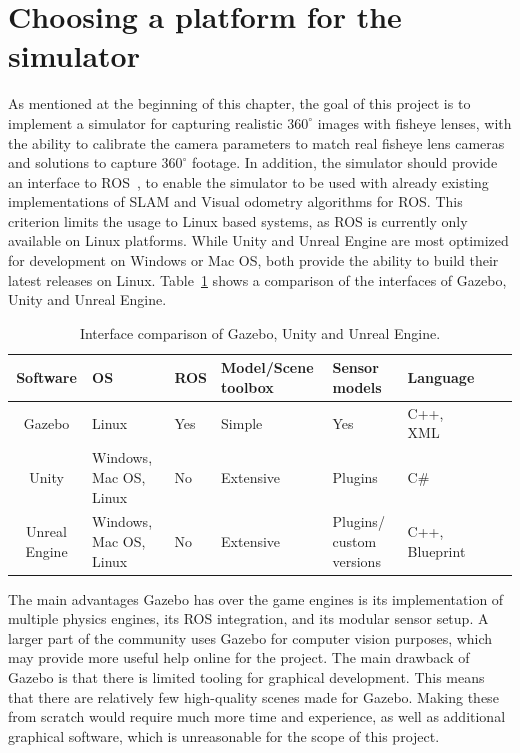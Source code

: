 \section{Choosing a platform for the simulator} \label{sec:Chooseplatform}

As mentioned at the beginning of this chapter, the goal of this project is to implement a simulator for capturing realistic $360^\circ$ images with fisheye lenses, with the ability to calibrate the camera parameters to match real fisheye lens cameras and solutions to capture $360^\circ$ footage. In addition, the simulator should provide an interface to ROS~\cite{ROSpaper}, to enable the simulator to be used with already existing implementations of SLAM and Visual odometry algorithms for ROS. This criterion limits the usage to Linux based systems, as ROS is currently only available on Linux platforms. While Unity and Unreal Engine are most optimized for development on Windows or Mac OS, both provide the ability to build their latest releases on Linux. Table~\ref{tab:comparison_interface} shows a comparison of the interfaces of Gazebo, Unity and Unreal Engine.

\begin{table}[!htb]
    \centering
    \caption{Interface comparison of Gazebo, Unity and Unreal Engine.}
    \label{tab:comparison_interface}
    \begin{tabular}{|c|>{\centering\arraybackslash}m{2cm}|>{\centering\arraybackslash}m{2cm}|>{\centering\arraybackslash}m{2.8cm}|>{\centering\arraybackslash}m{2cm}|>{\centering\arraybackslash}m{2cm}|>{\centering\arraybackslash}m{2cm}|>{\centering\arraybackslash}m{2cm}|} \hline
        \textbf{Software}          & \textbf{OS}  & \textbf{ROS} & \textbf{Model/Scene toolbox}   & \textbf{Sensor models} & \textbf{Language}              \\ \hline \hline
        Gazebo          & Linux           & Yes           & Simple  & Yes & C++, XML                 \\ \hline
        Unity           & Windows, Mac OS, Linux                    & No            & Extensive & Plugins & C\# \\ \hline
        Unreal Engine   & Windows, Mac OS, Linux  & No            & Extensive & Plugins/ custom versions & C++, Blueprint \\ \hline
    \end{tabular}
\end{table}

The main advantages Gazebo has over the game engines is its implementation of multiple physics engines, its ROS integration, and its modular sensor setup. A larger part of the community uses Gazebo for computer vision purposes, which may provide more useful help online for the project. The main drawback of Gazebo is that there is limited tooling for graphical development. This means that there are relatively few high-quality scenes made for Gazebo. Making these from scratch would require much more time and experience, as well as additional graphical software, which is unreasonable for the scope of this project. 

